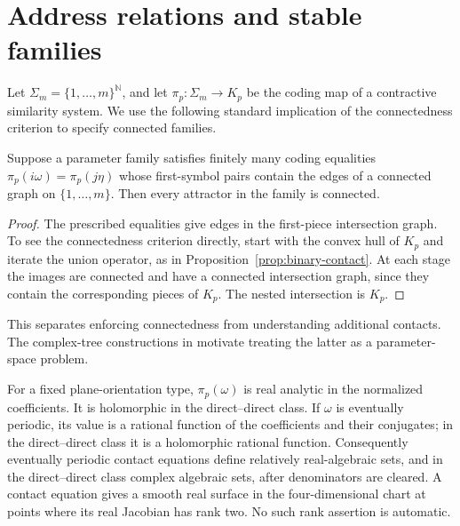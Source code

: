 \section{Address relations and stable families}
\label{sec:core-relations}

Let $\Sigma_m=\{1,\ldots,m\}^{\mathbb N}$, and let
$\pi_p:\Sigma_m\to K_p$ be the coding map of a contractive similarity
system. We use the following standard implication of the connectedness
criterion to specify connected families.

\begin{proposition}
\label{prop:prescribed-contacts}
Suppose a parameter family satisfies finitely many coding equalities
$\pi_p(i\omega)=\pi_p(j\eta)$ whose first-symbol pairs contain the
edges of a connected graph on $\{1,\ldots,m\}$. Then every attractor
in the family is connected.
\end{proposition}
\begin{proof}
The prescribed equalities give edges in the first-piece intersection
graph. To see the connectedness criterion directly, start with the
convex hull of $K_p$ and iterate the union operator, as in
Proposition~\ref{prop:binary-contact}. At each stage the images are
connected and have a connected intersection graph, since they contain
the corresponding pieces of $K_p$. The nested intersection is $K_p$.
\end{proof}

This separates enforcing connectedness from understanding additional
contacts. The complex-tree constructions in
\cite{Espigule2013,Espigule2018,Espigule2019a,Espigule2019b}
motivate treating the latter as a parameter-space problem.

\begin{proposition}
\label{prop:address-regularity}
For a fixed plane-orientation type, $\pi_p(\omega)$ is real analytic
in the normalized coefficients. It is holomorphic in the
direct--direct class. If $\omega$ is eventually periodic, its value
is a rational function of the coefficients and their conjugates;
in the direct--direct class it is a holomorphic rational function.
Consequently eventually periodic contact equations define relatively
real-algebraic sets, and in the direct--direct class complex algebraic
sets, after denominators are cleared. A contact equation gives a
smooth real surface in the four-dimensional chart at points where
its real Jacobian has rank two. No such rank assertion is automatic.
\end{proposition}

